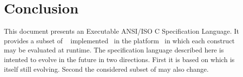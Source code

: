 
\chapter{Conclusion}

This document presents an Executable ANSI/ISO C Specification Language. It
provides a subset of \acsl~\cite{acsl} implemented~\cite{acslimplem} in the
\framac platform~\cite{framac} in which each construct may be evaluated at
runtime. The specification language described here is intented to evolve in the
future in two directions. First it is based on \acsl which is itself still
evolving. Second the considered subset of \acsl may also change.

